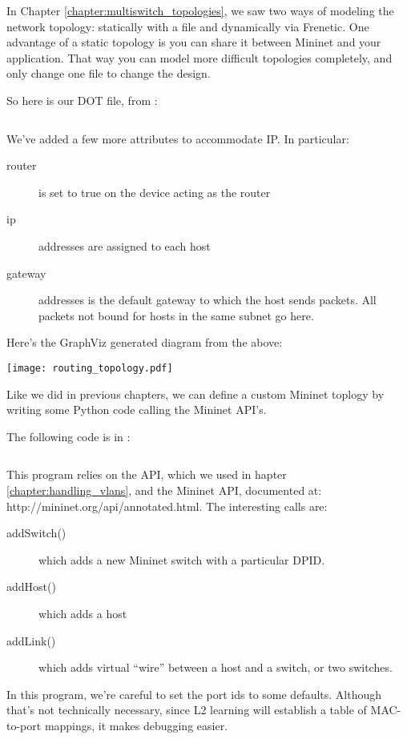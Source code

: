 In Chapter \ref{chapter:multiswitch_topologies}, we saw two ways of modeling the network topology:
statically with a  file and dynamically via Frenetic.  One advantage of a
static topology is you can share it between Mininet and your application.  That 
way you can model more difficult topologies completely, and only change one file
to change the design.  

So here is our DOT file, from :

\inputminted{python}{code/routing/topology.dot}

We've added a few more attributes to accommodate IP.  In particular:

\begin{description}
\item[router] is set to true on the device acting as the router
\item[ip] addresses are assigned to each host 
\item[gateway] addresses is the default gateway to which the host sends packets.  All packets not
bound for hosts in the same subnet go here.   
\end{description}

Here's the GraphViz generated diagram from the above:

\texttt{[image: routing\_topology.pdf]}

Like we did in previous chapters,  we
can define a custom Mininet toplogy by writing some Python code calling the Mininet
API's.  

The following code is in :

\inputminted{python}{code/routing/mn_dot_topology.py}

This program relies on the  API, which we used in 
hapter \ref{chapter:handling_vlans}, and 
the Mininet API, documented at: http://mininet.org/api/annotated.html.  The interesting calls are:

\begin{description}
\item[addSwitch()] which adds a new Mininet switch with a particular DPID.
\item[addHost()] which adds a host
\item[addLink()] which adds virtual ``wire'' between a host and a switch, or two switches.
\end{description}

In this program, we're careful to set the port ids to some defaults.  Although that's not
technically necessary, since L2 learning will establish a table of MAC-to-port mappings,
it makes debugging easier.    

